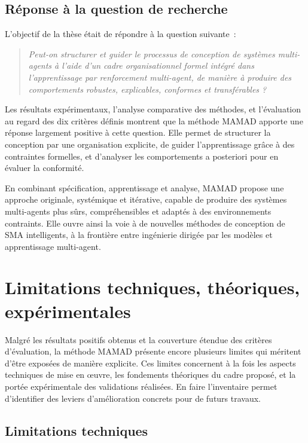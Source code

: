 \subsection*{Réponse à la question de recherche}

\noindent
L’objectif de la thèse était de répondre à la question suivante~:

\begin{quote}
    \emph{Peut-on structurer et guider le processus de conception de systèmes multi-agents à l’aide d’un cadre organisationnel formel intégré dans l’apprentissage par renforcement multi-agent, de manière à produire des comportements robustes, explicables, conformes et transférables ?}
\end{quote}

\noindent
Les résultats expérimentaux, l’analyse comparative des méthodes, et l’évaluation au regard des dix critères définis montrent que la méthode \ac{MAMAD} apporte une réponse largement positive à cette question. Elle permet de structurer la conception par une organisation explicite, de guider l’apprentissage grâce à des contraintes formelles, et d’analyser les comportements a posteriori pour en évaluer la conformité.

En combinant spécification, apprentissage et analyse, MAMAD propose une approche originale, systémique et itérative, capable de produire des systèmes multi-agents plus sûrs, compréhensibles et adaptés à des environnements contraints. Elle ouvre ainsi la voie à de nouvelles méthodes de conception de SMA intelligents, à la frontière entre ingénierie dirigée par les modèles et apprentissage multi-agent.

\section{Limitations techniques, théoriques, expérimentales}
\label{sec:limitations}

\noindent
Malgré les résultats positifs obtenus et la couverture étendue des critères d’évaluation, la méthode \ac{MAMAD} présente encore plusieurs limites qui méritent d’être exposées de manière explicite. Ces limites concernent à la fois les aspects techniques de mise en œuvre, les fondements théoriques du cadre proposé, et la portée expérimentale des validations réalisées. En faire l’inventaire permet d’identifier des leviers d’amélioration concrets pour de futurs travaux.

\subsection*{Limitations techniques}

